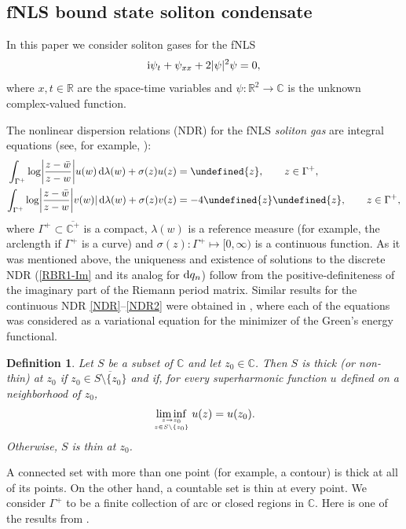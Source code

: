 \documentclass[10pt,a4paper]{amsart}
\numberwithin{equation}{section}
\newtheorem{Definition}[Theorem]{Definition}
\let\Re\undefined
\let\Im\undefined
\DeclareMathOperator{\Re}{Re}
\DeclareMathOperator{\Im}{Im}
\def\ra{\rightarrow}
\newcommand{\G}{\Gamma}
\def\C{{\mathbb C}}
\def\R{{\mathbb R}}
\def\l{\lambda}
\def\l{\lambda}
\def\G{\Gamma}
\begin{document}
\subsection{fNLS bound state soliton condensate}\label{sec-KdV}

In this paper we consider soliton gases for the fNLS
\begin{equation*} %
{\rm i} \psi_t + \psi_{xx} +2 |\psi|^2 \psi=0,
\end{equation*}
where $x,t\in \R$ are the space-time variables and $\psi\colon \R^2 \ra \C$ is the unknown complex-valued function.

The nonlinear dispersion relations (NDR) for the fNLS \textit{soliton gas} are
integral equations (see, for example, \cite{ET2020,TW}):
\begin{align}\label{NDR}
\int_{\G^+}\log\biggl|\frac{z-\bar w}{z-w}\biggr|u(w)\,{\rm d}\l(w)+\sigma(z)u(z)&=\Im{z},\qquad z\in \G^+,\\
\int_{\G^+}\log\biggl|\frac{z-\bar w}{z-w}\biggr|v(w)|\,{\rm d}\l(w)+\sigma(z)v(z)&=-4\Re{z}\Im{z},\qquad z\in \G^+,
\label{NDR2}
\end{align}
where $\G^+\subset \overline{\C^+}$ is a compact, $\l(w)$ is a reference measure (for example, the arclength if $\G^+$ is a curve) and $\sigma(z)\colon \G^+\mapsto [0,\infty)$ is a continuous function.
As it was mentioned above, the uniqueness and existence of solutions to the discrete NDR (\eqref{RBR1-Im} and its analog for ${\rm d}q_n$) follow from the positive-definiteness of the imaginary part of the Riemann period matrix.
Similar results for the continuous NDR \eqref{NDR}--\eqref{NDR2} were obtained in \cite{KT2021},
where each of the equations
was considered as a variational equation for the minimizer of the Green's energy functional.

\begin{Definition} \label{thick}
Let $S$ be a subset of $\mathbb C$ and let $z_0 \in
\mathbb C$. Then $S$ is thick (or non-thin) at
$z_0$ if $z_0 \in \overline{S \setminus \{z_0\}}$
and if, for every superharmonic function
$u$ defined on a neighborhood of $z_0$,
\[ \liminf_{z \ra z_0 \atop z \in S \setminus \{ z_0\}} u(z) = u(z_0). \]
Otherwise, $S$ is thin at $z_0$.
\end{Definition}

A connected set with more than one point (for example, a contour) is thick at
all of its points. On the other hand, a countable set
is thin at every point. We consider $\G^+$ to be a finite collection of arc or closed regions in $\C$. Here is one of the results from \cite{KT2021}.
\end{document}
